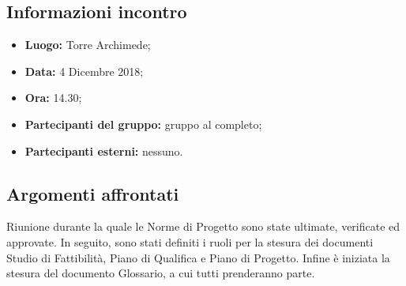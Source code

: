 \subsection{Informazioni incontro}
\begin{itemize}
	\item { \textbf{Luogo:} Torre Archimede;  }
	\item { \textbf{Data:} 4 Dicembre 2018; }
	\item { \textbf{Ora:} 14.30; }
	\item { \textbf{Partecipanti del gruppo:} gruppo al completo; }
	\item { \textbf{Partecipanti esterni:} nessuno. }
\end{itemize}


\subsection{Argomenti affrontati}
Riunione durante la quale le Norme di Progetto sono state ultimate, verificate ed approvate. In seguito, sono stati definiti i ruoli per la stesura dei documenti Studio di Fattibilità, Piano di Qualifica e Piano di Progetto. Infine è iniziata la stesura del documento Glossario, a cui tutti prenderanno parte.

